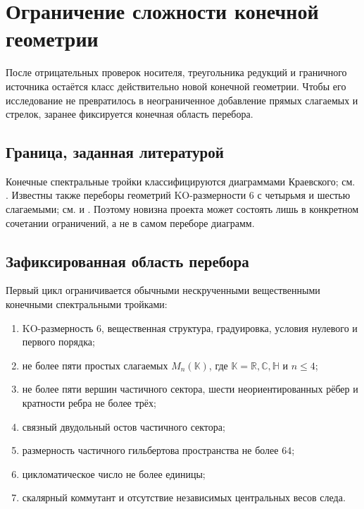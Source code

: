 \chapter{Ограничение сложности конечной геометрии}

После отрицательных проверок носителя, треугольника редукций и граничного
источника остаётся класс действительно новой конечной геометрии. Чтобы его
исследование не превратилось в неограниченное добавление прямых слагаемых и
стрелок, заранее фиксируется конечная область перебора.

\section{Граница, заданная литературой}

Конечные спектральные тройки классифицируются диаграммами Краевского; см.
. Известны также переборы геометрий KO-размерности
6 с четырьмя и шестью слагаемыми; см.  и
. Поэтому новизна проекта может состоять лишь в
конкретном сочетании ограничений, а не в самом переборе диаграмм.

\section{Зафиксированная область перебора}

\begin{definition}
Первый цикл ограничивается обычными нескрученными вещественными конечными
спектральными тройками:
\begin{enumerate}
 \item KO-размерность 6, вещественная структура, градуировка, условия
 нулевого и первого порядка;
 \item не более пяти простых слагаемых \(M_n(\mathbb K)\), где
 \(\mathbb K=\mathbb R,\mathbb C,\mathbb H\) и \(n\le4\);
 \item не более пяти вершин частичного сектора, шести неориентированных
 рёбер и кратности ребра не более трёх;
 \item связный двудольный остов частичного сектора;
 \item размерность частичного гильбертова пространства не более \(64\);
 \item цикломатическое число не более единицы;
 \item скалярный коммутант и отсутствие независимых центральных весов следа.
\end{enumerate}
\end{definition}


